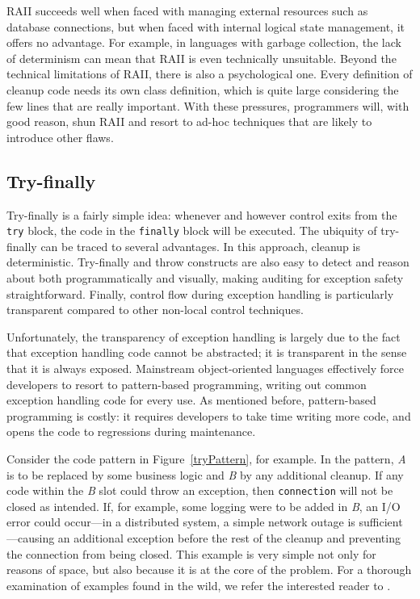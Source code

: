 \documentclass[11pt]{article}
\newcommand{\maybePage}{\null}
\begin{document}
RAII succeeds well when faced with managing external resources such as database connections, but when faced with internal logical state management, it offers no advantage.
For example, in languages with garbage collection, the lack of determinism can mean that RAII is even technically unsuitable.
Beyond the technical limitations of RAII, there is also a psychological one.
Every definition of cleanup code needs its own class definition, which is quite large considering the few lines that are really important.
With these pressures, programmers will, with good reason, shun RAII and resort to ad-hoc techniques that are likely to introduce other flaws.


\maybePage
\subsection{Try-finally}
\label{try-finally}

Try-finally is a fairly simple idea: whenever and however control exits from the \texttt{try} block, the code in the \texttt{finally} block will be executed.
The ubiquity of try-finally can be traced to several advantages.
In this approach, cleanup is deterministic.
Try-finally and throw constructs are also easy to detect and reason about both programmatically and visually, making auditing for exception safety straightforward.
Finally, control flow during exception handling is particularly transparent compared to other non-local control techniques.

Unfortunately, the transparency of exception handling is largely due to the fact that exception handling code cannot be abstracted;
it is transparent in the sense that it is always exposed.
Mainstream object-oriented languages effectively force developers to resort to pattern-based programming, writing out common exception handling code for every use.
As mentioned before, pattern-based programming is costly: it requires developers to take time writing more code, and opens the code to regressions during maintenance.

Consider the code pattern in Figure~\ref{tryPattern}, for example.
In the pattern, \textit{A} is to be replaced by some business logic and \textit{B} by any additional cleanup.
If any code within the \textit{B} slot could throw an exception, then \texttt{connection} will not be closed as intended.
If, for example, some logging were to be added in \textit{B}, an I/O error could occur---in a distributed system, a simple network outage is sufficient---causing an additional exception before the rest of the cleanup and preventing the connection from being closed.
This example is very simple not only for reasons of space, but also because it is at the core of the problem.
For a thorough examination of examples found in the wild, we refer the interested reader to \cite{WeimerNecula08}.
\end{document}
